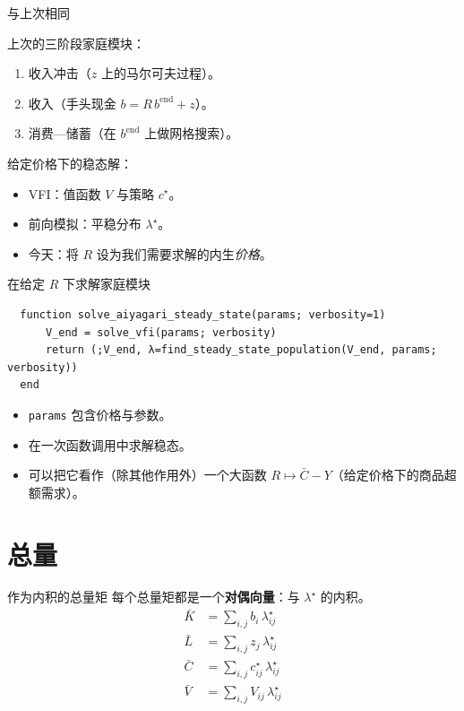 \documentclass[10pt,aspectratio=169]{beamer}
\begin{document}
\begin{frame}{与上次相同}

  上次的三阶段家庭模块：
  \begin{enumerate}
    \item 收入冲击（$z$ 上的马尔可夫过程）。
    \item 收入（手头现金 $b = R\,b^{\mathrm{end}} + z$）。
    \item 消费—储蓄（在 $b^{\mathrm{end}}$ 上做网格搜索）。
  \end{enumerate}

  给定价格下的稳态解：
  \begin{itemize}
    \item VFI：值函数 $V$ 与策略 $c^\star$。
    \item 前向模拟：平稳分布 $\lambda^\star$。
    \item 今天：将 $R$ 设为我们需要求解的内生\emph{价格}。
  \end{itemize}
\end{frame}

\begin{frame}[fragile]{在给定 $R$ 下求解家庭模块}
  \begin{lstlisting}
  function solve_aiyagari_steady_state(params; verbosity=1)
      V_end = solve_vfi(params; verbosity)
      return (;V_end, λ=find_steady_state_population(V_end, params; verbosity))
  end
  \end{lstlisting}

  \begin{itemize}
    \item \texttt{params} 包含价格与参数。
    \item 在一次函数调用中求解稳态。
    \item 可以把它看作（除其他作用外）一个大函数 $R \mapsto \bar C - Y$（给定价格下的商品超额需求）。
  \end{itemize}
\end{frame}

\section{总量}

\begin{frame}{作为内积的总量矩}
  每个总量矩都是一个\textbf{对偶向量}：与 $\lambda^\star$ 的内积。
  \begin{align*}
    \bar K &= \sum_{i,j} b_i \, \lambda^\star_{ij} \\
    \bar L &= \sum_{i,j} z_j \, \lambda^\star_{ij}        \\
    \bar C &= \sum_{i,j} c^\star_{ij} \, \lambda^\star_{ij} \\
    \bar V &= \sum_{i,j} V_{ij} \, \lambda^\star_{ij}
  \end{align*}
\end{frame}
\end{document}
